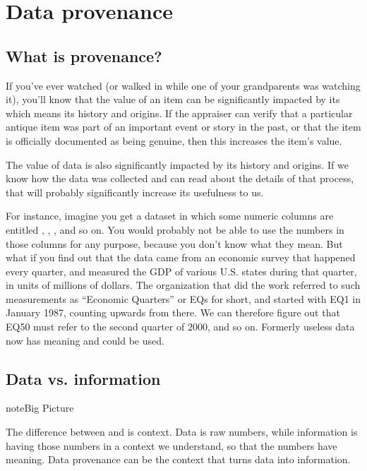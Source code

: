 \documentclass[letterpaper,10pt,english]{sphinxmanual}
\begin{document}
\section{Data provenance}
\label{\detokenize{chapter-13-etl:data-provenance}}

\subsection{What is provenance?}
\label{\detokenize{chapter-13-etl:what-is-provenance}}
If you’ve ever watched  (or walked in while one of your grandparents was watching it), you’ll know that the value of an item can be significantly impacted by its  which means its history and origins.  If the appraiser can verify that a particular antique item was part of an important event or story in the past, or that the item is officially documented as being genuine, then this increases the item’s value.

The value of data is also significantly impacted by its history and origins.  If we know how the data was collected and can read about the details of that process, that will probably significantly increase its usefulness to us.

For instance, imagine you get a dataset in which some numeric columns are entitled , , , and so on.  You would probably not be able to use the numbers in those columns for any purpose, because you don’t know what they mean.  But what if you find out that the data came from an economic survey that happened every quarter, and measured the GDP of various U.S. states during that quarter, in units of millions of dollars.  The organization that did the work referred to such measurements as “Economic Quarters” or EQs for short, and started with EQ1 in January 1987, counting upwards from there.  We can therefore figure out that EQ50 must refer to the second quarter of 2000, and so on.  Formerly useless data now has meaning and could be used.


\subsection{Data vs. information}
\label{\detokenize{chapter-13-etl:data-vs-information}}
\begin{sphinxadmonition}{note}{Big Picture}

The difference between  and  is context.  Data is raw numbers, while information is having those numbers in a context we understand, so that the numbers have meaning.  Data provenance can be the context that turns data into information.
\end{sphinxadmonition}
\end{document}
